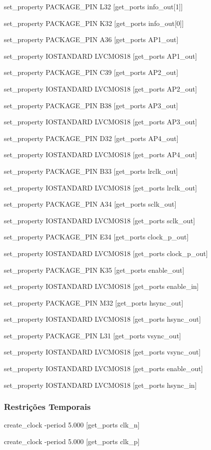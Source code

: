 set\_property PACKAGE\_PIN L32 [get\_ports {info\_out[1]}]

set\_property PACKAGE\_PIN K32 [get\_ports {info\_out[0]}]



set\_property PACKAGE\_PIN A36 [get\_ports AP1\_out]

set\_property IOSTANDARD LVCMOS18 [get\_ports AP1\_out]

set\_property PACKAGE\_PIN C39 [get\_ports AP2\_out]

set\_property IOSTANDARD LVCMOS18 [get\_ports AP2\_out]

set\_property PACKAGE\_PIN B38 [get\_ports AP3\_out]

set\_property IOSTANDARD LVCMOS18 [get\_ports AP3\_out]

set\_property PACKAGE\_PIN D32 [get\_ports AP4\_out]

set\_property IOSTANDARD LVCMOS18 [get\_ports AP4\_out]

set\_property PACKAGE\_PIN B33 [get\_ports lrclk\_out]

set\_property IOSTANDARD LVCMOS18 [get\_ports lrclk\_out]


set\_property PACKAGE\_PIN A34 [get\_ports sclk\_out]

set\_property IOSTANDARD LVCMOS18 [get\_ports sclk\_out]


set\_property PACKAGE\_PIN E34 [get\_ports clock\_p\_out]

set\_property IOSTANDARD LVCMOS18 [get\_ports clock\_p\_out]

set\_property PACKAGE\_PIN K35 [get\_ports enable\_out]

set\_property IOSTANDARD LVCMOS18 [get\_ports enable\_in]

set\_property PACKAGE\_PIN M32 [get\_ports hsync\_out]

set\_property IOSTANDARD LVCMOS18 [get\_ports hsync\_out]

set\_property PACKAGE\_PIN L31 [get\_ports vsync\_out]

set\_property IOSTANDARD LVCMOS18 [get\_ports vsync\_out]

set\_property IOSTANDARD LVCMOS18 [get\_ports enable\_out]

set\_property IOSTANDARD LVCMOS18 [get\_ports hsync\_in]

\subsubsection{Restrições Temporais}\label{ap2:planC_timing_cnstrs}

create\_clock -period 5.000 [get\_ports clk\_n]

create\_clock -period 5.000 [get\_ports clk\_p]